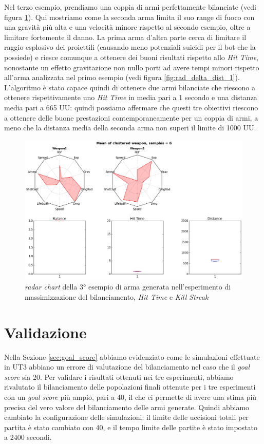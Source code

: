 \documentclass[12pt, italian]{toptesi}
\begin{document}
Nel terzo esempio, prendiamo una coppia di armi perfettamente bilanciate (vedi figura \ref{fig:rad_delta_dist_3}). Qui mostriamo come la seconda arma limita il suo range di fuoco con una gravità più alta e una velocità minore rispetto al secondo esempio, oltre a limitare fortemente il danno. La prima arma d'altra parte cerca di limitare il raggio esplosivo dei proiettili (causando meno potenziali suicidi per il bot che la possiede) e riesce comunque a ottenere dei buoni risultati rispetto allo \emph{Hit Time}, nonostante un effetto gravitazione non nullo porti ad avere tempi minori rispetto all'arma analizzata nel primo esempio (vedi figura \ref{fig:rad_delta_dist_1}). 
L'algoritmo è stato capace quindi di ottenere due armi bilanciate che riescono a ottenere rispettivamente uno \emph{Hit Time} in media pari a 1 secondo e una distanza media pari a 665 UU: quindi possiamo affermare che questi tre obiettivi riescono a ottenere delle buone prestazioni contemporaneamente per un coppia di armi, a meno che la distanza media della seconda arma non superi il limite di 1000 UU.

\begin{figure}[tp]
\centering
\includegraphics[width=1.0\textwidth]{rad_delta_dist_3}
\caption{\emph{radar chart} della 3° esempio di arma generata nell'esperimento di massimizzazione del bilanciamento, \emph{Hit Time} e \emph{Kill Streak}}
\label{fig:rad_delta_dist_3}
\end{figure}

\section{Validazione}
Nella Sezione \ref{sec:goal_score} abbiamo evidenziato come le simulazioni effettuate in UT3 abbiano un errore di valutazione del bilanciamento nel caso che il \emph{goal score} sia 20.
Per validare i risultati ottenuti nei tre esperimenti, abbiamo rivalutato il bilanciamento delle popolazioni finali ottenute per i tre esperimenti con un \emph{goal score} più ampio, pari a 40, il che ci permette di avere una stima più precisa del vero valore del bilanciamento delle armi generate.
Quindi abbiamo cambiato la configurazione delle simulazioni: il limite delle uccisioni totali per partita è stato cambiato con 40, e il tempo limite delle partite è stato impostato a 2400 secondi.
\end{document}
